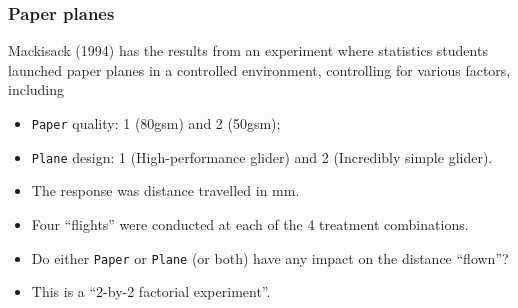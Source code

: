 \documentclass[a4paper]{article}
\begin{document}
\subsubsection{Paper planes}
Mackisack (1994) has the results from an experiment where statistics students launched paper planes in a controlled environment, controlling for various factors, including
\begin{itemize}
	\item \lstinline|Paper| quality: 1 (80gsm) and 2 (50gsm);
	\item \lstinline|Plane| design: 1 (High-performance glider) and 2 (Incredibly simple glider).
	\item The response was distance travelled in mm.
	\item Four ``flights'' were conducted at each of the 4 treatment combinations.
	\item Do either \lstinline|Paper| or \lstinline|Plane| (or both) have any impact on the distance ``flown''?
	\item This is a ``2-by-2 factorial experiment''.
\end{itemize}
\end{document}
